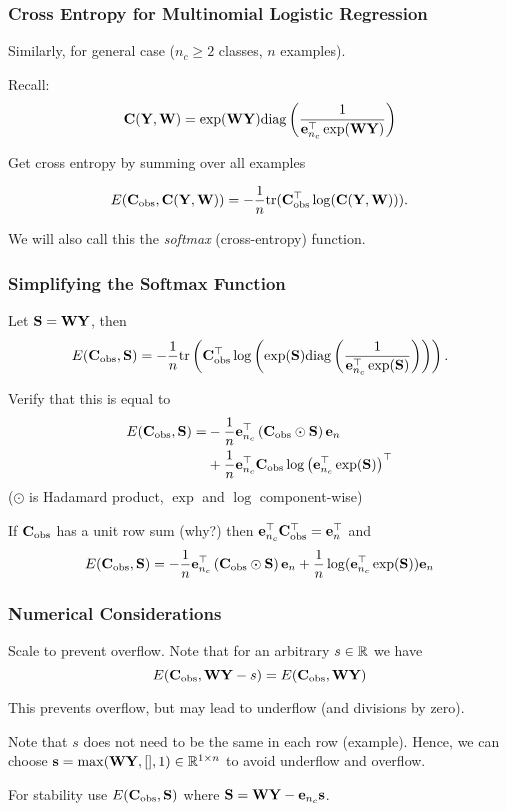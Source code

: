 \documentclass[12pt,fleqn,handout]{beamer}
\begin{document}
\begin{frame}
	\frametitle{Cross Entropy for Multinomial Logistic Regression}
	
	Similarly, for general case ($n_c\geq2$ classes, $n$ examples). 
	
	Recall: 
	$${\bf C}({\bf Y},{\bf W})  =   \exp({\bf W} {\bf Y}) {\rm diag} \left({\frac 1 {{\bf e}_{n_c}^\top\exp({\bf W} {\bf Y})}}  \right)  $$

\bigskip

Get cross entropy by summing over all examples

$$ E({\bf C}_{\rm obs},{\bf C}({\bf Y},{\bf W})) = -\frac{1}{n}{\rm tr}( {\bf C}_{\rm obs}^\top\log({\bf C}({\bf Y},{\bf W})) ). $$

We will also call this the \emph{softmax} (cross-entropy) function.


\end{frame}


\begin{frame}\frametitle{Simplifying the Softmax Function}

Let ${\bf S} = {\bf W} {\bf Y}$, then 
$$ 
E({\bf C}_{\rm obs},{\bf S}) = -\frac{1}{n}{\rm tr}\left({\bf C}_{\rm obs}^{\top} \log\left({\exp({\bf S})}{\rm diag}\left(\frac{1}{{\bf e}_{n_c}^\top \exp({\bf S}) }\right) \right)\right). 
$$

Verify that this is equal to
\begin{align*}
	 E({\bf C}_{\rm obs},{\bf S}) = & -\frac{1}{n}{\bf e}_{n_c}^{\top} \left( {\bf C}_{\rm obs} \odot {\bf S}\right) {\bf e}_{n} \\
	 & + \frac{1}{n} {\bf e}_{n_c}^\top {\bf C}_{\rm obs}\log\left({\bf e}_{n_c}^\top\exp({\bf S})\right)^\top
\end{align*}
($\odot$ is Hadamard product, $\exp$ and $\log$ component-wise)
\bigskip
\pause


If ${\bf C}_{\rm obs}$ has a unit row sum (why?) then $ {\bf e}_{n_c}^\top {\bf C}_{\rm obs}^\top = {\bf e}_n^\top$
and 
$$ E({\bf C}_{\rm obs},{\bf S}) = -\frac{1}{n}{\bf e}_{n_c}^{\top} \left( {\bf C}_{\rm obs} \odot {\bf S}\right) {\bf e}_{n} 
+ \frac{1}{n}\log({\bf e}_{n_c}^\top\exp({\bf S})){\bf e}_{n} $$


\end{frame}



\begin{frame}\frametitle{Numerical Considerations}

Scale to prevent overflow. Note that for an arbitrary $s\in\mathbb{R}$ we have
$$ E({\bf C}_{\rm obs},{\bf W}{\bf Y}-s) = E({\bf C}_{\rm obs},{\bf W}{\bf Y}) $$

This prevents overflow, but may lead to underflow (and divisions by zero).

\bigskip
\pause

Note that $s$ does not need to be the same in each row (example). Hence, 
we can choose ${\bf s} = \max({\bf W}{\bf Y},[],1 ) \in \mathbb{R}^{1\times n}$ to avoid underflow and overflow.

\bigskip
\begin{center}
For stability use $E({\bf C}_{\rm obs},{\bf S})$ where $ {\bf S} = {\bf W} {\bf Y} - {\bf e}_{n_c} {\bf s}$.
\end{center}
\end{frame}
\end{document}
